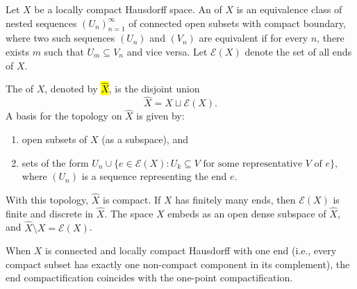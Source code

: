 \begin{definition} \label{definition:end_compactification_of_a_topological_space}
    Let $X$ be a locally compact Hausdorff space. An  of $X$ is an equivalence class of nested sequences $(U_n)_{n=1}^\infty$ of connected open subsets with compact boundary, where two such sequences $(U_n)$ and $(V_n)$ are equivalent if for every $n$, there exists $m$ such that $U_m \subseteq V_n$ and vice versa. Let $\mathcal{E}(X)$ denote the set of all ends of $X$.

    The  of $X$, denoted by \hl{$\hat{X}$}, is the disjoint union
    $$\hat{X} = X \sqcup \mathcal{E}(X).$$
    A basis for the topology on $\hat{X}$ is given by:
    \begin{enumerate}
        \item open subsets of $X$ (as a subspace), and
        \item sets of the form $U_n \cup \{e \in \mathcal{E}(X) : U_k \subseteq V \text{ for some representative } V \text{ of } e\}$, where $(U_n)$ is a sequence representing the end $e$.
    \end{enumerate}
    With this topology, $\hat{X}$ is compact. If $X$ has finitely many ends, then $\mathcal{E}(X)$ is finite and discrete in $\hat{X}$. The space $X$ embeds as an open dense subspace of $\hat{X}$, and $\hat{X} \setminus X = \mathcal{E}(X)$.

    When $X$ is connected and locally compact Hausdorff with one end (i.e., every compact subset has exactly one non-compact component in its complement), the end compactification coincides with the one-point compactification.
\end{definition}
